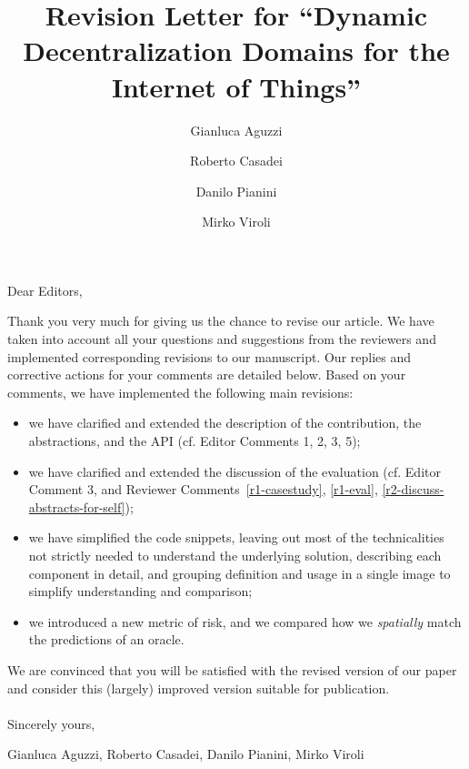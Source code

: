 \documentclass{article}
\newcounter{reviewer}
\newcounter{comment}[reviewer]
\begin{document}
\acused{}

\title{{\Large Revision Letter for} ``Dynamic Decentralization
Domains for the Internet of
Things''}
\author{
Gianluca Aguzzi
\and
Roberto Casadei
\and 
Danilo Pianini
\and 
Mirko Viroli
}

\maketitle

Dear Editors, \newline

Thank you very much for giving us the chance to revise our article.
%
We have taken into account all your questions and suggestions from the reviewers and implemented corresponding revisions to our manuscript.
%
Our replies and corrective actions for your comments are detailed below.
%
Based on your comments, we have implemented the following main revisions:
%
\begin{itemize}
\item we have clarified and extended the description of  the contribution, the abstractions, and the API (cf. Editor Comments 1, 2, 3, 5);
\item we have clarified and extended the discussion of the evaluation (cf. Editor Comment 3, and Reviewer Comments~\ref{r1-casestudy}, \ref{r1-eval}, \ref{r2-discuss-abstracts-for-self});
\item we have simplified the code snippets,
	leaving out most of the technicalities not strictly needed to understand the underlying solution,
	describing each component in detail,
	and grouping definition and usage in a single image
	to simplify understanding and comparison;
\item we introduced a new metric of risk,
	and we compared how we \emph{spatially}
	match the predictions of an oracle.
\end{itemize}
%
%
We are convinced that you will be satisfied with the revised version of our paper and consider this (largely) improved version suitable for publication.
\\ ~ \\

\noindent Sincerely yours,

Gianluca Aguzzi, Roberto Casadei, Danilo Pianini, Mirko Viroli


\raggedbottom

\end{document}
